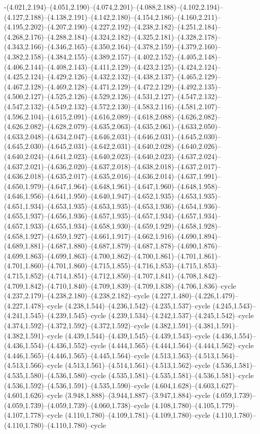-(4.021,2.194)--(4.051,2.190)--(4.074,2.201)--(4.088,2.188)--(4.102,2.194)--(4.127,2.188)--(4.138,2.191)--(4.142,2.180)--(4.154,2.186)--(4.160,2.211)--(4.195,2.202)--(4.207,2.190)--(4.227,2.192)--(4.238,2.182)--(4.251,2.184)--(4.268,2.176)--(4.288,2.184)--(4.324,2.182)--(4.325,2.181)--(4.328,2.178)--(4.343,2.166)--(4.346,2.165)--(4.350,2.164)--(4.378,2.159)--(4.379,2.160)--(4.382,2.158)--(4.384,2.155)--(4.389,2.157)--(4.402,2.152)--(4.405,2.148)--(4.406,2.144)--(4.408,2.143)--(4.411,2.129)--(4.423,2.125)--(4.424,2.124)--(4.425,2.124)--(4.429,2.126)--(4.432,2.132)--(4.438,2.137)--(4.465,2.129)--(4.467,2.128)--(4.469,2.128)--(4.471,2.129)--(4.472,2.129)--(4.492,2.135)--(4.500,2.127)--(4.525,2.126)--(4.529,2.126)--(4.531,2.127)--(4.547,2.132)--(4.547,2.132)--(4.549,2.132)--(4.572,2.130)--(4.583,2.116)--(4.581,2.107)--(4.596,2.104)--(4.615,2.091)--(4.616,2.089)--(4.618,2.088)--(4.626,2.082)--(4.626,2.082)--(4.628,2.079)--(4.635,2.063)--(4.635,2.061)--(4.633,2.050)--(4.633,2.048)--(4.634,2.047)--(4.646,2.031)--(4.646,2.031)--(4.645,2.030)--(4.645,2.030)--(4.645,2.031)--(4.642,2.031)--(4.640,2.028)--(4.640,2.026)--(4.640,2.024)--(4.641,2.023)--(4.640,2.023)--(4.640,2.023)--(4.637,2.024)--(4.637,2.021)--(4.636,2.020)--(4.637,2.018)--(4.638,2.018)--(4.637,2.017)--(4.636,2.018)--(4.635,2.017)--(4.635,2.016)--(4.636,2.014)--(4.637,1.991)--(4.650,1.979)--(4.647,1.964)--(4.648,1.961)--(4.647,1.960)--(4.648,1.958)--(4.646,1.956)--(4.641,1.950)--(4.640,1.947)--(4.652,1.935)--(4.653,1.935)--(4.651,1.934)--(4.653,1.935)--(4.653,1.935)--(4.653,1.936)--(4.654,1.936)--(4.655,1.937)--(4.656,1.936)--(4.657,1.935)--(4.657,1.934)--(4.657,1.934)--(4.657,1.933)--(4.655,1.934)--(4.658,1.930)--(4.659,1.929)--(4.658,1.928)--(4.658,1.927)--(4.659,1.927)--(4.661,1.917)--(4.662,1.916)--(4.690,1.894)--(4.689,1.881)--(4.687,1.880)--(4.687,1.879)--(4.687,1.878)--(4.690,1.876)--(4.699,1.863)--(4.699,1.863)--(4.700,1.862)--(4.700,1.861)--(4.701,1.861)--(4.701,1.860)--(4.701,1.860)--(4.715,1.855)--(4.716,1.853)--(4.715,1.853)--(4.715,1.852)--(4.714,1.851)--(4.712,1.850)--(4.707,1.841)--(4.708,1.842)--(4.709,1.842)--(4.710,1.840)--(4.709,1.839)--(4.709,1.838)--(4.706,1.836)--cycle (4.237,2.179)--(4.238,2.180)--(4.238,2.182)--cycle (4.227,1.480)--(4.226,1.479)--(4.227,1.478)--cycle (4.238,1.544)--(4.236,1.542)--(4.235,1.537)--cycle (4.245,1.543)--(4.241,1.545)--(4.239,1.545)--cycle (4.239,1.534)--(4.242,1.537)--(4.245,1.542)--cycle (4.374,1.592)--(4.372,1.592)--(4.372,1.592)--cycle (4.382,1.591)--(4.381,1.591)--(4.382,1.591)--cycle (4.439,1.544)--(4.439,1.545)--(4.439,1.543)--cycle (4.436,1.554)--(4.436,1.554)--(4.436,1.552)--cycle (4.444,1.565)--(4.444,1.564)--(4.444,1.562)--cycle (4.446,1.565)--(4.446,1.565)--(4.445,1.564)--cycle (4.513,1.563)--(4.513,1.564)--(4.513,1.566)--cycle (4.513,1.561)--(4.514,1.561)--(4.513,1.562)--cycle (4.536,1.581)--(4.535,1.580)--(4.536,1.580)--cycle (4.535,1.581)--(4.535,1.581)--(4.536,1.581)--cycle (4.536,1.592)--(4.536,1.591)--(4.535,1.590)--cycle (4.604,1.628)--(4.603,1.627)--(4.601,1.626)--cycle (3.948,1.888)--(3.944,1.887)--(3.947,1.884)--cycle (4.059,1.739)--(4.059,1.739)--(4.059,1.739)--(4.060,1.738)--cycle (4.108,1.780)--(4.105,1.779)--(4.107,1.778)--cycle (4.110,1.780)--(4.109,1.781)--(4.109,1.780)--cycle (4.110,1.780)--(4.110,1.780)--(4.110,1.780)--cycle 
